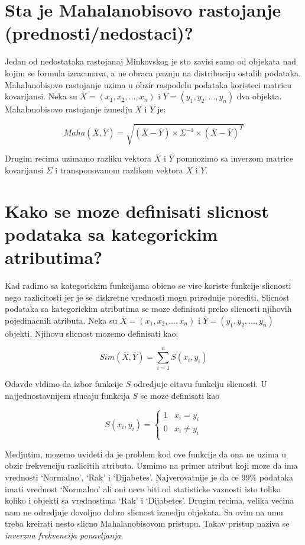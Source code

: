 \documentclass[a4paper]{article}
\begin{document}
\section{Sta je Mahalanobisovo rastojanje (prednosti/nedostaci)?}

Jedan od nedostataka rastojanaj Minkovskog je sto zavisi samo od objekata nad kojim se formula
izracunava, a ne obraca paznju na distribuciju ostalih podataka. Mahalanobisovo rastojanje uzima u
obzir raspodelu podataka koristeci matricu kovarijansi. Neka su
\(\overline{X}=(x_1,x_2,\ldots,x_n)\) i \(\overline{Y}=(y_1,y_2,\ldots,y_n)\) dva objekta.
Mahalanobisovo rastojanje izmedju \(\overline{X}\) i \(\overline{Y}\) je:

\[
    Maha(\overline{X}, \overline{Y}) =
    \sqrt{
        (\overline{X} - \overline{Y}) \times \Sigma^{-1} \times (\overline{X} - \overline{Y})^{T}
    }
\]

Drugim recima uzimamo razliku vektora \(\overline{X}\) i \(\overline{Y}\) pomnozimo sa inverzom
matrice kovarijansi \(\Sigma\) i transponovanom razlikom vektora \(\overline{X}\) i \(\overline{Y}\).

\section{Kako se moze definisati slicnost podataka sa kategorickim atributima?}

Kad radimo sa kategorickim funkcijama obicno se vise koriste funkcije slicnosti nego razlicitosti
jer je se diskretne vrednosti mogu prirodnije porediti.  Slicnost podataka sa kategorickim
atributima se moze definisati preko slicnosti njihovih pojedinacnih atributa. Neka su
\(\overline{X}=(x_1,x_2,\ldots,x_n)\) i \(\overline{Y}=(y_1,y_2,\ldots,y_n)\) objekti. Njihovu
slicnost mozemo definisati kao:

\[
    Sim(\overline{X}, \overline{Y}) = \sum_{i = 1}^{n} S(x_i, y_i)
\]


Odavde vidimo da izbor funkcije \(S\) odredjuje citavu funkciju slicnosti. U najjednostavnijem
slucaju funkcija \(S\) se moze definisati kao

\[
    S(x_i, y_i) =
    \begin{cases}
        1 & x_i = y_i \\
        0 & x_i \neq y_i \\
    \end{cases}
\]

Medjutim, mozemo uvideti da je problem kod ove funkcije da ona ne uzima u obzir frekvenciju
razlicitih atributa. Uzmimo na primer atribut koji moze da ima vrednosti `Normalno', `Rak' i
`Dijabetes'. Najverovatnije je da ce 99\% podataka imati vrednost `Normalno' ali oni nece biti od
statisticke vaznosti isto toliko koliko i objekti sa vrednostima `Rak' i `Dijabetes'. Drugim recima,
velika vecina nam ne odredjuje dovoljno dobro slicnost izmedju objekata. Sa ovim na umu treba
kreirati nesto slicno Mahalanobisovom pristupu. Takav pristup naziva se \emph{inverzna frekvencija
ponavljanja}.
\end{document}
